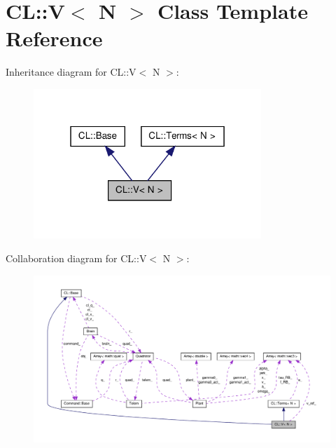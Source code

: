 \hypertarget{classCL_1_1V}{\section{\-C\-L\-:\-:\-V$<$ \-N $>$ \-Class \-Template \-Reference}
\label{classCL_1_1V}
}


\-Inheritance diagram for \-C\-L\-:\-:\-V$<$ \-N $>$\-:\nopagebreak
\begin{figure}[H]
\begin{center}
\leavevmode
\includegraphics[width=244pt]{classCL_1_1V__inherit__graph}
\end{center}
\end{figure}


\-Collaboration diagram for \-C\-L\-:\-:\-V$<$ \-N $>$\-:\nopagebreak
\begin{figure}[H]
\begin{center}
\leavevmode
\includegraphics[width=350pt]{classCL_1_1V__coll__graph}
\end{center}
\end{figure}
